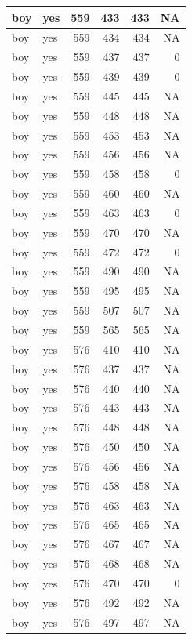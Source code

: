 \documentclass[man]{apa6}
\begin{document}
\begin{tabular}{l|l|r|r|r|r}
\hline
boy & yes & 559 & 433 & 433 & NA\\
\hline
boy & yes & 559 & 434 & 434 & NA\\
\hline
boy & yes & 559 & 437 & 437 & 0\\
\hline
boy & yes & 559 & 439 & 439 & 0\\
\hline
boy & yes & 559 & 445 & 445 & NA\\
\hline
boy & yes & 559 & 448 & 448 & NA\\
\hline
boy & yes & 559 & 453 & 453 & NA\\
\hline
boy & yes & 559 & 456 & 456 & NA\\
\hline
boy & yes & 559 & 458 & 458 & 0\\
\hline
boy & yes & 559 & 460 & 460 & NA\\
\hline
boy & yes & 559 & 463 & 463 & 0\\
\hline
boy & yes & 559 & 470 & 470 & NA\\
\hline
boy & yes & 559 & 472 & 472 & 0\\
\hline
boy & yes & 559 & 490 & 490 & NA\\
\hline
boy & yes & 559 & 495 & 495 & NA\\
\hline
boy & yes & 559 & 507 & 507 & NA\\
\hline
boy & yes & 559 & 565 & 565 & NA\\
\hline
boy & yes & 576 & 410 & 410 & NA\\
\hline
boy & yes & 576 & 437 & 437 & NA\\
\hline
boy & yes & 576 & 440 & 440 & NA\\
\hline
boy & yes & 576 & 443 & 443 & NA\\
\hline
boy & yes & 576 & 448 & 448 & NA\\
\hline
boy & yes & 576 & 450 & 450 & NA\\
\hline
boy & yes & 576 & 456 & 456 & NA\\
\hline
boy & yes & 576 & 458 & 458 & NA\\
\hline
boy & yes & 576 & 463 & 463 & NA\\
\hline
boy & yes & 576 & 465 & 465 & NA\\
\hline
boy & yes & 576 & 467 & 467 & NA\\
\hline
boy & yes & 576 & 468 & 468 & NA\\
\hline
boy & yes & 576 & 470 & 470 & 0\\
\hline
boy & yes & 576 & 492 & 492 & NA\\
\hline
boy & yes & 576 & 497 & 497 & NA\\

\end{tabular}
\end{document}
